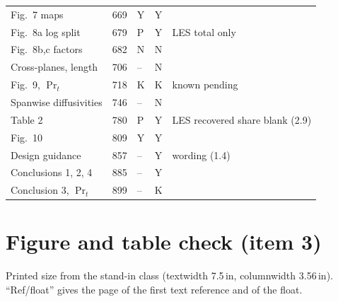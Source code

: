 \documentclass[10pt]{article}
\begin{document}
{\begin{longtable}{@{}L{4.2cm} l l l L{7.0cm}@{}}
Fig.~7 maps & 669 & Y & Y & \\
Fig.~8a log split & 679 & P & Y & LES total only \\
Fig.~8b,c factors & 682 & N & N & \\
Cross-planes, length & 706 & -- & N & \\
Fig.~9, $\Pr_t$ & 718 & K & K & known pending \\
Spanwise diffusivities & 746 & -- & N & \\
Table 2 & 780 & P & Y & LES recovered share blank (2.9) \\
Fig.~10 & 809 & Y & Y & \\
Design guidance & 857 & -- & Y & wording (1.4) \\
Conclusions 1, 2, 4 & 885 & -- & Y & \\
Conclusion 3, $\Pr_t$ & 899 & -- & K & \\
\bottomrule
\end{longtable}}

\section{Figure and table check (item 3)}\label{sec:figtable}

Printed size from the stand-in class (textwidth 7.5\,in, columnwidth 3.56\,in). ``Ref/float'' gives the page of
the first text reference and of the float.
\end{document}
